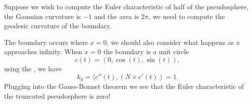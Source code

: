 Suppose we wish to compute the Euler characteristic of half of the pseudosphere,
the Gaussian curvature is $-1$ and the area is $2\pi$, we need to compute
the geodesic curvature of the boundary. 

The boundary occurs where $x=0$, we should also consider what happens as $x$ approaches
infinity.  When $x=0$ the boundary is a unit circle 
$$c(t)=(0,\cos(t),\sin(t)),$$ using the , we have
$$k_g=\langle c''(t),(N\times c'(t))=1.$$
Plugging into the Gauss-Bonnet theorem we see that
the Euler characteristic of the truncated pseudosphere is zero!




